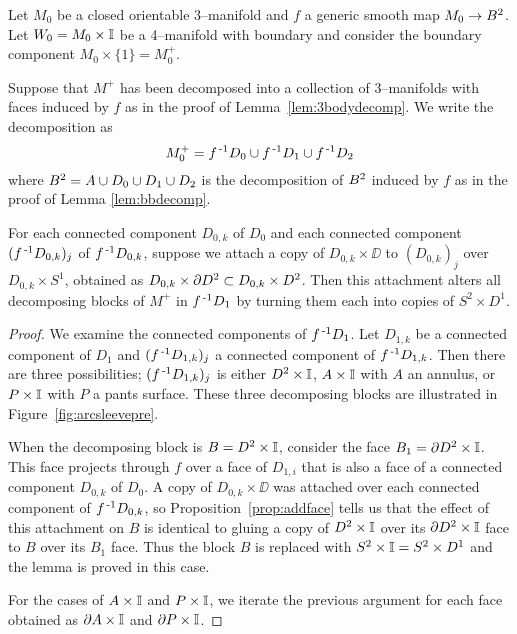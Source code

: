 \begin{lem}
	\label{lem:3body2handlept1}
	Let $M_0$ be a closed orientable 3--manifold and $f$ a generic smooth map $M_0\to B^2$.
	Let $W_0=M_0\times\mathbb{I}$ be a 4--manifold with boundary and consider the boundary component $M_0\times\{1\}=M_0^+$.
	
	Suppose that $M^+$ has been decomposed into a collection of 3--manifolds with faces induced by $f$ as in the proof of Lemma~\ref{lem:3bodydecomp}.
	We write the decomposition as
	\[
		M_0^+ = f^{\,\text{-}1} D_0\cup f^{\,\text{-}1} D_1\cup f^{\,\text{-}1} D_2
	\]
	where $B^2=A\cup D_0\cup D_1\cup D_2$ is the decomposition of $B^2$ induced by $f$ as in the proof of Lemma \ref{lem:bbdecomp}.
	
	For each connected component $D_{0,k}$ of $D_0$ and each connected component $(f^{\,\text{-}1} D_{0,k})_j$ of $f^{\,\text{-}1} D_{0,k}$, suppose we attach a copy of $D_{0,k}\times\DD$ to $(D_{0,k})_j$ over $D_{0,k}\times S^1$, obtained as $D_{0,k}\times \partial D^2\subset D_{0,k}\times D^2$.
	Then this attachment alters all decomposing blocks of $M^+$ in $f^{\,\text{-}1} D_1$ by turning them each into copies of $S^2\times D^1$.

\end{lem}


\begin{proof}
	We examine the connected components of $f^{\,\text{-}1} D_1$.
	Let $D_{1,k}$ be a connected component of $D_1$ and $(f^{\,\text{-}1} D_{1,k})_j$ a connected component of $f^{\,\text{-}1} D_{1,k}$.
	Then there are three possibilities; $(f^{\,\text{-}1} D_{1,k})_j$ is either $D^2\times\mathbb{I}$, $A\times\mathbb{I}$ with $A$ an annulus, or $P\times\mathbb{I}$ with $P$ a pants surface.
	These three decomposing blocks are illustrated in Figure~\ref{fig:arcsleevepre}.
	
	When the decomposing block is $B=D^2\times\mathbb{I}$, consider the face $B_1=\partial D^2\times \mathbb{I}$.
	This face projects through $f$ over a face of $D_{1,i}$ that is also a face of a connected component $D_{0,k}$ of $D_0$.
	A copy of $D_{0,k}\times\DD$ was attached over each connected component of $f^{\,\text{-}1} D_{0,k}$, so Proposition~\ref{prop:addface} tells us that the effect of this attachment on $B$ is identical to gluing a copy of $D^2\times \mathbb{I}$ over its $\partial D^2\times \mathbb{I}$ face to $B$ over its $B_1$ face.
	Thus the block $B$ is replaced with $S^2\times\mathbb{I}=S^2\times D^1$ and the lemma is proved in this case.
	
	For the cases of $A\times\mathbb{I}$ and $P\times\mathbb{I}$, we iterate the previous argument for each face obtained as $\partial A\times\mathbb{I}$ and $\partial P\times\mathbb{I}$.	
\end{proof}

